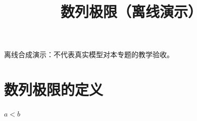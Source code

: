 \documentclass[UTF8,fontset=fandol,11pt]{ctexart}
\title{数列极限（离线演示）}
\date{}
\begin{document}
\maketitle
\par\noindent 离线合成演示：不代表真实模型对本专题的教学验收。\par
\section{数列极限的定义}\label{sec:S01}
$a<b$\par
\end{document}
